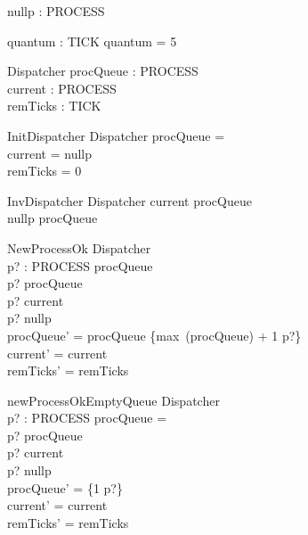 
\begin{axdef}
    nullp : PROCESS
\end{axdef}

\begin{axdef}
    quantum : TICK
\where
    quantum = 5
\end{axdef}

\begin{schema}{Dispatcher}
    procQueue : \nat \pfun PROCESS \\
    current : PROCESS \\
    remTicks : TICK
\end{schema}

\begin{schema}{InitDispatcher}
    Dispatcher
\where
    procQueue = \emptyset \\
    current = nullp \\
    remTicks = 0
\end{schema}

\begin{schema}{InvDispatcher}
    Dispatcher
\where
    current \notin \ran procQueue \\
    nullp \notin \ran procQueue
\end{schema}

\begin{schema}{NewProcessOk}
    \Delta Dispatcher \\
    p? : PROCESS
\where
    procQueue \neq \emptyset \\
    p? \notin \ran procQueue \\
    p? \neq current \\
    p? \neq nullp \\
    procQueue' = procQueue \cup \{max~(\dom procQueue) + 1 \mapsto p?\} \\
    current' = current \\
    remTicks' = remTicks
\end{schema}

\begin{schema}{newProcessOkEmptyQueue}
    \Delta Dispatcher \\
    p? : PROCESS
\where
    procQueue = \emptyset \\
    p? \notin \ran procQueue \\
    p? \neq current \\
    p? \neq nullp \\
    procQueue' = \{1 \mapsto p?\} \\
    current' = current \\
    remTicks' = remTicks
\end{schema}

